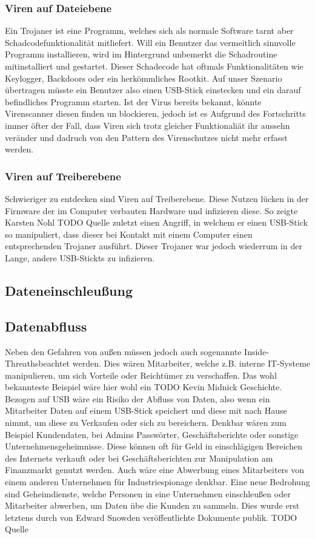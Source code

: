 \subsubsection{Viren auf Dateiebene}
Ein Trojaner ist eine Programm, welches sich als normale Software tarnt aber Schadcodefunktionalität mitliefert. \cite{Stamp2006} Will ein Benutzer das vermeitlich sinnvolle Programm installieren, wird im Hintergrund unbemerkt die Schadroutine mitinstalliert und gestartet. Dieser Schadecode hat oftmals Funktionalitäten wie Keylogger, Backdoors oder ein herkömmliches Rootkit. Auf unser Szenario übertragen müsste ein Benutzer also einen USB-Stick einstecken und ein darauf befindliches Programm starten. Ist der Virus bereits bekannt, könnte Virenscanner diesen finden un blockieren, jedoch ist es Aufgrund des Fortschritts immer öfter der Fall, dass Viren sich trotz gleicher Funktionaliät ihr aussehn veränder und dadruch von den Pattern des Virenschutzes nicht mehr erfasst werden.
			
\subsubsection{Viren auf Treiberebene}
Schwieriger zu entdecken sind Viren auf Treiberebene. Diese Nutzen lücken in der Firmware der im Computer verbauten Hardware und infizieren diese. So zeigte Karsten Nohl TODO Quelle zuletzt einen Angriff, in welchem er einen USB-Stick so manipuliert, dass dieser bei Kontakt mit einem Computer einen entsprechenden Trojaner ausführt. Dieser Trojaner war jedoch wiederrum in der Lange, andere USB-Stickts zu infizieren.

\subsection{Dateneinschleußung}

			
\subsection{Datenabfluss}
Neben den Gefahren von außen müssen jedoch auch sogenannte \glqq Inside-Threaths\grqq beachtet werden. Dies wären Mitarbeiter, welche z.B. interne IT-Systeme manipulieren, um sich Vorteile oder Reichtümer zu verschaffen. Das wohl bekannteste Beispiel wäre hier wohl ein TODO Kevin Midnick Geschichte. Bezogen auf USB wäre ein Risiko der Abfluss von Daten, also wenn ein Mitarbeiter Daten auf einem USB-Stick speichert und diese mit nach Hause nimmt, um diese zu Verkaufen oder sich zu bereichern. Denkbar wären zum Beispiel Kundendaten, bei Admins Passwörter, Geschäftsberichte oder sonstige Unternehmensgeheimnisse. Diese können oft für Geld in einschlägigen Bereichen des Internets verkauft oder bei Geschäftsberichten zur Manipulation am Finanzmarkt genutzt werden. Auch wäre eine Abwerbung eines Mitarbeiters von einem anderen Unternehmen für Industriespionage denkbar.
Eine neue Bedrohung sind Geheimdienste, welche Personen in eine Unternehmen einschleußen oder Mitarbeiter abwerben, um Daten übe die Kunden zu sammeln. Dies wurde erst letztens durch von Edward Snowden veröffentlichte Dokumente publik. TODO Quelle

